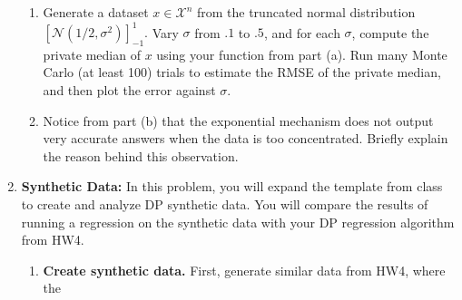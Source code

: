 \documentclass[11pt]{article}
\newcommand{\calX}{\mathcal{X}}
\begin{document}
\begin{enumerate}[leftmargin=*]
\begin{enumerate}
            \item Generate a dataset $x\in\calX^n$ from the truncated normal distribution $\left[\mathcal{N}(1/2,\sigma^2)\right]_{-1}^1.$ Vary $\sigma$ from $.1$ to $.5$, and for each $\sigma$, compute the private median of $x$ using your function from part (a). Run many Monte Carlo (at least 100)
            trials to estimate the RMSE
            of the private median, and then plot the error against $\sigma$.

            \item Notice from part (b) that the exponential mechanism does
            not output very accurate answers when the data is too concentrated. Briefly explain the reason behind this observation.


        \end{enumerate}


        \item \textbf{Synthetic Data:}
        In this problem, you will expand the template from class to create and analyze DP synthetic data. You will compare the results of running a regression on the synthetic data with your DP regression algorithm from HW4.

        \begin{enumerate}
            \item \textbf{Create synthetic data.}
            First, generate similar data from HW4, where the


\end{enumerate}
\end{enumerate}
\end{document}
